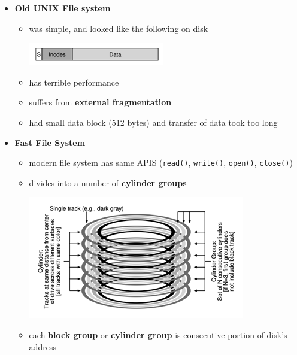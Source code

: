 \documentclass[12pt]{article}
\begin{document}
\begin{itemize}
    \item \textbf{Old UNIX File system}
    \begin{itemize}
        \item was simple, and looked like the following on disk

        \begin{center}
        \includegraphics[width=0.6\linewidth]{images/midterm_1_solution_16.png}
        \end{center}
        \item has terrible performance
        \item suffers from \textbf{external fragmentation}
        \item had small data block (512 bytes) and transfer of data took too long
    \end{itemize}

    \item \textbf{Fast File System}

    \begin{itemize}
        \item modern file system has same APIS (\texttt{read()}, \texttt{write()}, \texttt{open()}, \texttt{close()})
        \item divides into a number of \textbf{cylinder groups}

        \begin{center}
        \includegraphics[width=0.8\linewidth]{images/midterm_1_solution_17.png}
        \end{center}
        \item each \textbf{block group} or \textbf{cylinder group} is consecutive
        portion of disk's address


\end{itemize}
\end{itemize}
\end{document}

